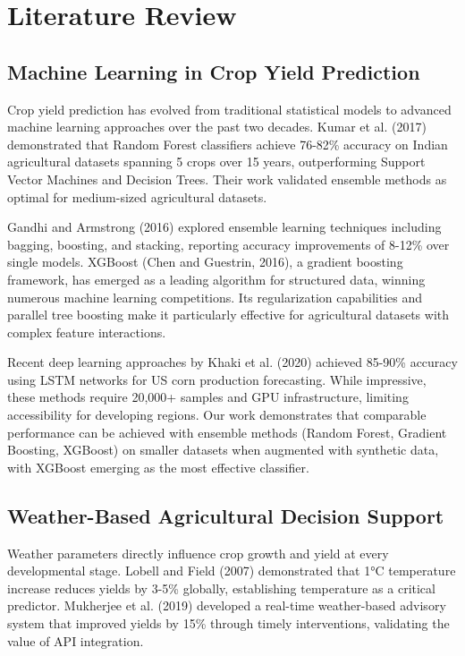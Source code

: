 \documentclass[10pt,twocolumn]{article}
\begin{document}
\section{Literature Review}

\subsection{Machine Learning in Crop Yield Prediction}
Crop yield prediction has evolved from traditional statistical models to advanced machine learning approaches over the past two decades. Kumar et al. (2017) demonstrated that Random Forest classifiers achieve 76-82\% accuracy on Indian agricultural datasets spanning 5 crops over 15 years, outperforming Support Vector Machines and Decision Trees. Their work validated ensemble methods as optimal for medium-sized agricultural datasets.

Gandhi and Armstrong (2016) explored ensemble learning techniques including bagging, boosting, and stacking, reporting accuracy improvements of 8-12\% over single models. XGBoost (Chen and Guestrin, 2016), a gradient boosting framework, has emerged as a leading algorithm for structured data, winning numerous machine learning competitions. Its regularization capabilities and parallel tree boosting make it particularly effective for agricultural datasets with complex feature interactions.

Recent deep learning approaches by Khaki et al. (2020) achieved 85-90\% accuracy using LSTM networks for US corn production forecasting. While impressive, these methods require 20,000+ samples and GPU infrastructure, limiting accessibility for developing regions. Our work demonstrates that comparable performance can be achieved with ensemble methods (Random Forest, Gradient Boosting, XGBoost) on smaller datasets when augmented with synthetic data, with XGBoost emerging as the most effective classifier.

\subsection{Weather-Based Agricultural Decision Support}
Weather parameters directly influence crop growth and yield at every developmental stage. Lobell and Field (2007) demonstrated that 1°C temperature increase reduces yields by 3-5\% globally, establishing temperature as a critical predictor. Mukherjee et al. (2019) developed a real-time weather-based advisory system that improved yields by 15\% through timely interventions, validating the value of API integration.
\end{document}
